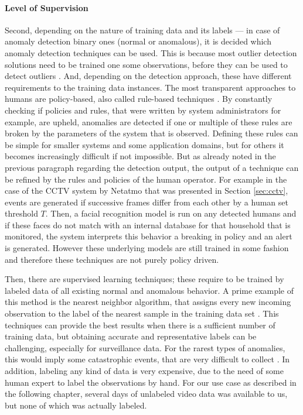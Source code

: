 \paragraph{Level of Supervision} \label{par:supervision}
Second, depending on the nature of training data and its labels --- in case of anomaly detection binary ones (normal or anomalous), it is decided which anomaly detection techniques can be used. This is because most outlier detection solutions need to be trained one some observations, before they can be used to detect outliers \cite{Bishop2006patttern, chandola2009anomaly}. And, depending on the detection approach, these have different requirements to the training data instances. The most transparent approaches to humans are policy-based, also called rule-based techniques \cite{huebscher2008survey}. By constantly checking if policies and rules, that were written by system administrators for example, are upheld, anomalies are detected if one or multiple of these rules are broken by the parameters of the system that is observed. Defining these rules can be simple for smaller systems and some application domains, but for others it becomes increasingly difficult if not impossible. But as already noted in the previous paragraph regarding the detection output, the output of a technique can be refined by the rules and policies of the human operator. For example in the case of the CCTV system by Netatmo that was presented in Section \ref{sec:cctv}, events are generated if successive frames differ from each other by a human set threshold $T$. Then, a facial recognition model is run on any detected humans and if these faces do not match with an internal database for that household that is monitored, the system interprets this behavior a breaking in policy and an alert is generated. However these underlying models are still trained in some fashion and therefore these techniques are not purely policy driven.

Then, there are supervised learning techniques; these require to be trained by labeled data of all existing normal and anomalous behavior. A prime example of this method is the nearest neighbor algorithm, that assigns every new incoming observation to the label of the nearest sample in the training data set \cite{cover1967nearest}. This techniques can provide the best results when there is a sufficient number of training data, but obtaining accurate and representative labels can be challenging, especially for surveillance data. For the rarest types of anomalies, this would imply some catastrophic events, that are very difficult to collect \cite{chandola2009anomaly}. In addition, labeling any kind of data is very expensive, due to the need of some human expert to label the observations by hand. For our use case as described in the following chapter, several days of unlabeled video data was available to us, but none of which was actually labeled.

